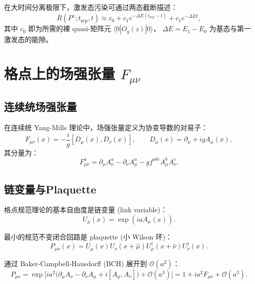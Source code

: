 \documentclass[12pt,a4paper]{ctexart}
\newcommand{\Pz}{P^{z}}
\newcommand{\tsep}{t_{\text{sep}}}
\begin{document}
在大时间分离极限下，激发态污染可通过两态截断描述：
\begin{equation}\label{eq:ratio_fit}
\boxed{
R(\Pz; \tsep, t) \approx c_0 + c_1 e^{-\Delta E (\tsep - t)}
    + c_1 e^{-\Delta E t},
}
\end{equation}
其中 $c_0$ 即为所需的裸 quasi-矩阵元 $\langle 0 | O_g(z) | 0 \rangle$，
$\Delta E = E_1 - E_0$ 为基态与第一激发态的能隙。


\section{格点上的场强张量 $F_{\mu\nu}$}\label{sec:fmunu}

\subsection{连续统场强张量}

在连续统 Yang-Mills 理论中，场强张量定义为协变导数的对易子\cite{场强张量}：
\begin{equation}\label{eq:F_continuum}
F_{\mu\nu}(x) = -\frac{i}{g} [D_{\mu}(x), D_{\nu}(x)],
\qquad D_{\mu}(x) = \partial_{\mu} + i g A_{\mu}(x),
\end{equation}
其分量为：
\begin{equation}
F^{a}_{\mu\nu} = \partial_{\mu} A^{a}_{\nu}
    - \partial_{\nu} A^{a}_{\mu}
    - g f^{abc} A^{b}_{\mu} A^{c}_{\nu}.
\end{equation}

\subsection{链变量与Plaquette}

格点规范理论的基本自由度是链变量 (link variable)\cite{场强张量}：
\begin{equation}\label{eq:link}
U_{\mu}(x) = \exp(i a A_{\mu}(x)).
\end{equation}

最小的规范不变闭合回路是 plaquette (小 Wilson 环)：
\begin{equation}\label{eq:plaquette}
\boxed{
P_{\mu\nu}(x) = U_{\mu}(x) U_{\nu}(x+\hat{\mu})
    U^{\dagger}_{\mu}(x+\hat{\nu}) U^{\dagger}_{\nu}(x).
}
\end{equation}

通过 Baker-Campbell-Hausdorff (BCH) 展开到 $\mathcal{O}(a^{2})$：
\begin{equation}\label{eq:plaquette_bch}
P_{\mu\nu} = \exp\Big[ i a^{2} \big( \partial_{\mu} A_{\nu}
    - \partial_{\nu} A_{\mu} + i [A_{\mu}, A_{\nu}] \big)
    + \mathcal{O}(a^{3}) \Big]
    = 1 + i a^{2} F_{\mu\nu} + \mathcal{O}(a^{3}).
\end{equation}
\end{document}
